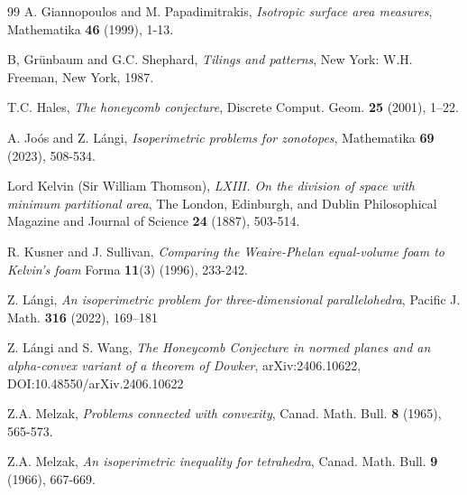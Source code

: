 \documentclass[twoside]{amsart}
\theoremstyle{definition}
\begin{document}
\begin{thebibliography}{99}
 A. Giannopoulos and M. Papadimitrakis, \emph{Isotropic surface area measures}, Mathematika \textbf{46} (1999), 1-13.

 B, Gr\"unbaum and G.C. Shephard, \emph{Tilings and patterns}, New York: W.H. Freeman, New York, 1987.

 T.C. Hales, \emph{The honeycomb conjecture}, Discrete Comput. Geom. \textbf{25} (2001), 1–22.




 A. Jo\'os and Z. L\'angi, \emph{Isoperimetric problems for zonotopes}, Mathematika \textbf{69} (2023), 508-534.

 Lord Kelvin (Sir William Thomson), \emph{LXIII. On the division of space with minimum partitional area}, The London, Edinburgh, and Dublin Philosophical Magazine and Journal of Science \textbf{24} (1887), 503-514.

 R. Kusner and J. Sullivan, \emph{Comparing the Weaire-Phelan equal-volume foam to Kelvin's foam} Forma \textbf{11}(3) (1996), 233-242. 

 Z. L\'angi, \emph{An isoperimetric problem for three-dimensional parallelohedra}, Pacific J. Math. \textbf{316} (2022), 169–181


 Z. L\'angi and S. Wang, \emph{The Honeycomb Conjecture in normed planes and an alpha-convex variant of a theorem of Dowker}, arXiv:2406.10622, DOI:10.48550/arXiv.2406.10622

 Z.A. Melzak, \emph{Problems connected with convexity}, Canad. Math. Bull. \textbf{8} (1965), 565-573.

 Z.A. Melzak, \emph{An isoperimetric inequality for tetrahedra}, Canad. Math. Bull. \textbf{9} (1966), 667-669.


\end{thebibliography}
\end{document}

